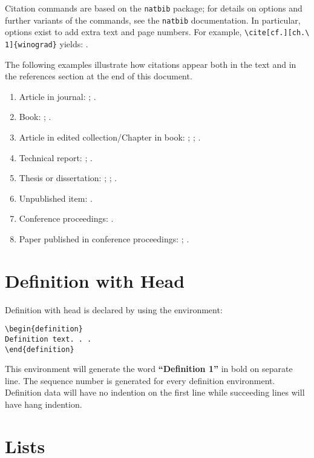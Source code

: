 \documentclass[manuscript]{clv3}
\begin{document}
Citation commands are based on the \verb|natbib| package;
for details on options and further variants of the commands,
see the \verb|natbib| documentation.  In particular, options 
exist to add extra text and page numbers.  For example, 
\verb|\cite[cf.][ch.\ 1]{winograd}| yields: \cite[cf.][ch.\ 1]{winograd}.

The following examples illustrate how citations appear both in the text
and in the references section at the end of this document.
\begin{enumerate}
\item Article in journal: 
 ;
 .
\item Book: 
  ;
  .
\item Article in edited collection/Chapter in book: 
  ;
  ;
  .
\item Technical report:
  ;
  .
\item Thesis or dissertation: 
  ;
  ;
  .
\item Unpublished item: 
  .
\item Conference proceedings: 
  .
\item Paper published in conference proceedings: 
  ;
  .
\end{enumerate}


\section{Definition with Head}

Definition with head is declared by using the environment:
\\
\begin{verbatim}
\begin{definition}
Definition text. . .
\end{definition}
\end{verbatim}

This environment will generate the word {\bf ``Definition 1''} in bold on separate
line. The sequence number is generated for every definition environment. Definition 
data will have no indention on the first line while succeeding lines will have hang 
indention.

\section{Lists}
\end{document}
